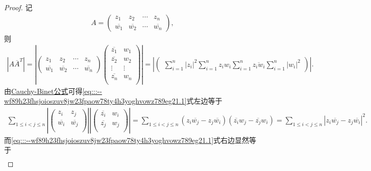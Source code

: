 \documentclass[../../main.tex]{subfiles}%
\begin{document}
\begin{proof}
记
\begin{align*}
A=\begin{pmatrix}
z_1& z_2& \cdots& z_n\\
\overline{w_1}& \overline{w_2}& \cdots& \overline{w_n}
\end{pmatrix},
\end{align*}
则
\begin{align}
\left| A\overline{A}^T \right|
=\left| \begin{pmatrix}
z_1& z_2& \cdots& z_n\\
\overline{w_1}& \overline{w_2}& \cdots& \overline{w_n}
\end{pmatrix} \begin{pmatrix}
\overline{z_1}& w_1\\
\overline{z_2}& w_2\\
\vdots& \vdots\\
\overline{z_n}& w_n\\
\end{pmatrix} \right| 
=\left| \begin{pmatrix}
\sum_{i=1}^n{\left| z_i \right|^2} \sum_{i=1}^n{z_iw_i}
\sum_{i=1}^n{\overline{z_iw_i}} \sum_{i=1}^n{\left| w_i \right|^2}
\end{pmatrix} \right|.\label{eq:::--wf89h23fhsjoioszuv8jw23fpaow78ty4h3yoghvowz789eg21.1}
\end{align}
由\hyperref[Basis of Algebra-theorem:Cauchy-Binet公式]{Cauchy-Binet公式}可得\eqref{eq:::--wf89h23fhsjoioszuv8jw23fpaow78ty4h3yoghvowz789eg21.1}式左边等于
\begin{align*}
\sum_{1\leqslant i<j\leqslant n}{\left| \begin{pmatrix}
z_i& z_j\\
\overline{w_i}& \overline{w_j}\\
\end{pmatrix} \right| \left| \begin{pmatrix}
\overline{z_i}& w_i\\
\overline{z_j}& w_j\\
\end{pmatrix} \right|}
=\sum_{1\leqslant i<j\leqslant n}{\left( z_i\overline{w_j}-z_j\overline{w_i} \right) \left( \overline{z_i}w_j-\overline{z_j}w_i \right)}
=\sum_{1\leqslant i<j\leqslant n}{\left| z_i\overline{w_j}-z_j\overline{w_i} \right|^2}.
\end{align*}
而\eqref{eq:::--wf89h23fhsjoioszuv8jw23fpaow78ty4h3yoghvowz789eg21.1}式右边显然等于
\begin{align*}

\end{align*}
\end{proof}
\end{document}
